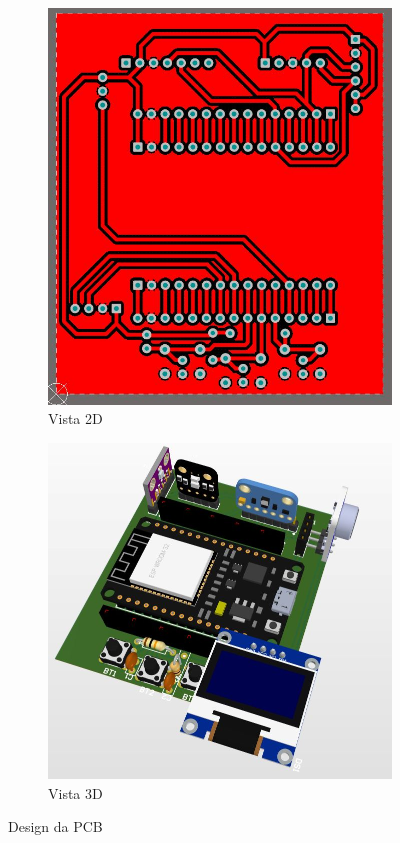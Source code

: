 \documentclass[../monografia.tex]{subfiles}
\begin{document}
\begin{figure}[ht]
	\centering
	\begin{subfigure}{0.5\textwidth}
	  \centering
	  \includegraphics[width=.7\linewidth]{pcb_2}
	  \caption{Vista 2D}
	  \label{fig:sub1}
	\end{subfigure}%
	\begin{subfigure}{0.5\textwidth}
	  \centering
	  \includegraphics[width=.9\linewidth]{hw-3d}
	  \caption{Vista 3D}
	  \label{fig:sub2}
	\end{subfigure}
	\caption{Design da PCB}
	\label{fig:test}
\end{figure}
\end{document}
